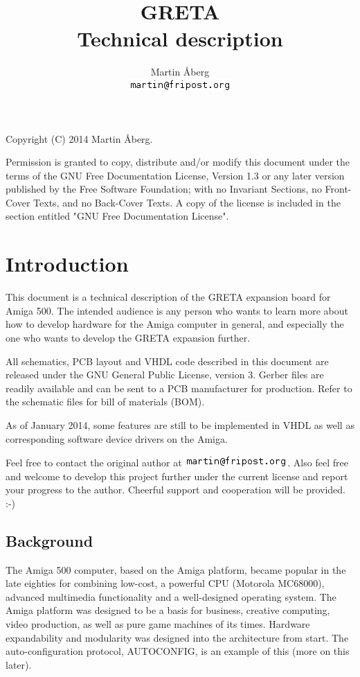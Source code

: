 \documentclass[a4paper]{report}
\title{GRETA\\Technical description}
\author{Martin Åberg \\ \includegraphics[scale=0.8]{email.png}}
\begin{document}
\maketitle
Copyright (C) 2014 Martin Åberg.\newline

Permission is granted to copy, distribute and/or modify this
document under the terms of the GNU Free Documentation License,
Version 1.3 or any later version published by the Free Software
Foundation; with no Invariant Sections, no Front-Cover Texts,
and no Back-Cover Texts.  A copy of the license is included
in the section entitled "GNU Free Documentation License".
\tableofcontents

\chapter{Introduction}
This document is a technical description of the GRETA expansion
board for Amiga 500. The intended audience is any person who
wants to learn more about how to develop hardware for the Amiga
computer in general, and especially the one who wants to develop
the GRETA expansion further.

All schematics, PCB layout and VHDL code described in this
document are released under the GNU General Public License,
version 3. Gerber files are readily available and can be sent
to a PCB manufacturer for production. Refer to the schematic
files for bill of materials (BOM).

As of January 2014, some features are still to be implemented
in VHDL as well as corresponding software device drivers on
the Amiga.

Feel free to contact the original author at
\includegraphics[scale=0.8]{email.png}. Also feel free and
welcome to develop this project further under the current
license and report your progress to the author. Cheerful
support and cooperation will be provided. :-)

\section{Background}
The Amiga 500 computer, based on the Amiga platform, became
popular in the late eighties for combining low-cost, a powerful
CPU (Motorola MC68000), advanced multimedia functionality
and a well-designed operating system. The Amiga platform
was designed to be a basis for business, creative computing,
video production, as well as pure game machines of its times.
Hardware expandability and modularity was designed into the
architecture from start. The auto-configuration protocol,
AUTOCONFIG, is an example of this (more on this later).
\end{document}
